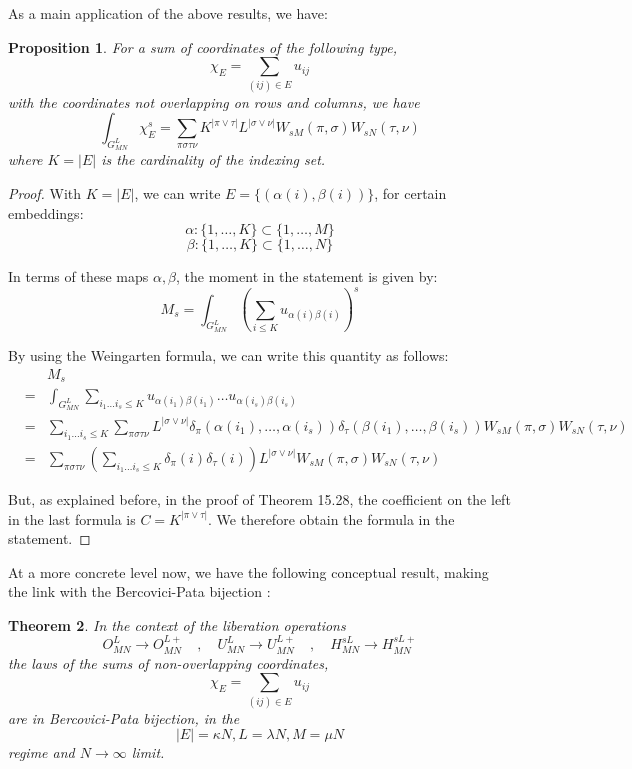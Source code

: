\documentclass[12pt]{amsbook}
\newtheorem{theorem}{Theorem}[chapter]
\newtheorem{proposition}[theorem]{Proposition}
\begin{document}
As a main application of the above results, we have:


\begin{proposition}
For a sum of coordinates of the following type,
$$\chi_E=\sum_{(ij)\in E}u_{ij}$$
with the coordinates not overlapping on rows and columns, we have
$$\int_{G_{MN}^L}\chi_E^s=\sum_{\pi\sigma\tau\nu}K^{|\pi\vee\tau|}L^{|\sigma\vee\nu|}W_{sM}(\pi,\sigma)W_{sN}(\tau,\nu)$$
where $K=|E|$ is the cardinality of the indexing set.
\end{proposition}

\begin{proof}
With $K=|E|$, we can write $E=\{(\alpha(i),\beta(i))\}$, for certain embeddings:
$$\alpha:\{1,\ldots,K\}\subset\{1,\ldots,M\}$$
$$\beta:\{1,\ldots,K\}\subset\{1,\ldots,N\}$$

In terms of these maps $\alpha,\beta$, the moment in the statement is given by:
$$M_s=\int_{G_{MN}^L}\left(\sum_{i\leq K}u_{\alpha(i)\beta(i)}\right)^s$$

By using the Weingarten formula, we can write this quantity as follows:
\begin{eqnarray*}
&&M_s\\
&=&\int_{G_{MN}^L}\sum_{i_1\ldots i_s\leq K}u_{\alpha(i_1)\beta(i_1)}\ldots u_{\alpha(i_s)\beta(i_s)}\\
&=&\sum_{i_1\ldots i_s\leq K}\sum_{\pi\sigma\tau\nu}L^{|\sigma\vee\nu|}\delta_\pi(\alpha(i_1),\ldots,\alpha(i_s))\delta_\tau(\beta(i_1),\ldots,\beta(i_s))W_{sM}(\pi,\sigma)W_{sN}(\tau,\nu)\\
&=&\sum_{\pi\sigma\tau\nu}\left(\sum_{i_1\ldots i_s\leq K}\delta_\pi(i)\delta_\tau(i)\right)L^{|\sigma\vee\nu|}W_{sM}(\pi,\sigma)W_{sN}(\tau,\nu)
\end{eqnarray*}

But, as explained before, in the proof of Theorem 15.28, the coefficient on the left in the last formula is $C=K^{|\pi\vee\tau|}$. We therefore obtain the formula in the statement.
\end{proof}

At a more concrete level now, we have the following conceptual result, making the link with the Bercovici-Pata bijection \cite{bpa}:


\begin{theorem}
In the context of the liberation operations 
$$O_{MN}^L\to O_{MN}^{L+}\quad,\quad 
U_{MN}^L\to U_{MN}^{L+}\quad,\quad 
H_{MN}^{sL}\to H_{MN}^{sL+}$$ 
the laws of the sums of non-overlapping coordinates,
$$\chi_E=\sum_{(ij)\in E}u_{ij}$$
are in Bercovici-Pata bijection, in the 
$$|E|=\kappa N,L=\lambda N,M=\mu N$$
regime and $N\to\infty$ limit.
\end{theorem}
\end{document}
